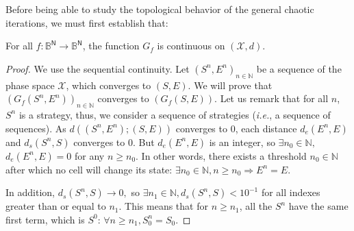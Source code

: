 \documentclass{article}
\begin{document}
Before being able to study the topological behavior of the general 
chaotic iterations, we must first establish that:

\begin{proposition}
 For all $f:\mathds{B}^\mathsf{N} \longrightarrow \mathds{B}^\mathsf{N} $, the function $G_f$ is continuous on 
$\left( \mathcal{X},d\right)$.
\end{proposition}


\begin{proof}
We use the sequential continuity.
Let $(S^n,E^n)_{n\in \mathds{N}}$ be a sequence of the phase space $\mathcal{X}$, which converges to $(S,E)$. We will prove that $\left(
G_{f}(S^n,E^n)\right) _{n\in \mathds{N}}$ converges to $\left(
G_{f}(S,E)\right) $. Let us remark that for all $n$, $S^n$ is a strategy,
thus, we consider a sequence of strategies (\emph{i.e.}, a sequence of
sequences).\newline
As $d((S^n,E^n);(S,E))$ converges to 0, each distance $d_{e}(E^n,E)$ and $d_{s}(S^n,S)$ converges
to 0. But $d_{e}(E^n,E)$ is an integer, so $\exists n_{0}\in \mathds{N},$ $d_{e}(E^n,E)=0$ for any $n\geqslant n_{0}$.\newline
In other words, there exists a threshold $n_{0}\in \mathds{N}$ after which no
cell will change its state:
$\exists n_{0}\in \mathds{N},n\geqslant n_{0}\Rightarrow E^n = E.$

In addition, $d_{s}(S^n,S)\longrightarrow 0,$ so $\exists n_{1}\in \mathds{N},d_{s}(S^n,S)<10^{-1}$ for all indexes greater than or equal to $n_{1}$. This means that for $n\geqslant n_{1}$, all the $S^n$ have the same
first term, which is $S^0$: $\forall n\geqslant n_{1},S_0^n=S_0.$


\end{proof}
\end{document}
